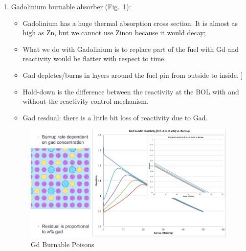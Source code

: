 \documentclass{school-22.211-notes}
\begin{document}
\begin{enumerate}
\item Gadolinium burnable absorber (Fig.~\ref{Gd-BP}): 
  \begin{itemize}
  \item Gadolinium has a huge thermal absorption cross section. It is almost as high as Zn, but we cannot use Zinon because it would decay; 
  \item What we do with Gadolinium is to replace part of the fuel with Gd and reactivity would be flatter with respect to time. 
  \item Gad depletes/burns in layers around the fuel pin from outside to inside. ]
  \item Hold-down is the difference between the reactivity at the BOL with and without the reactivity control mechanism. 
  \item Gad resdual: there is a little bit loss of reactivity due to Gad. 
  \end{itemize}
  \begin{figure}
    \centering
    \includegraphics[width=5in]{images/dfs/Gd-BP.png}
    \caption{Gd Burnable Poisons}  \label{Gd-BP}
  \end{figure}
\end{enumerate}
\end{document}
